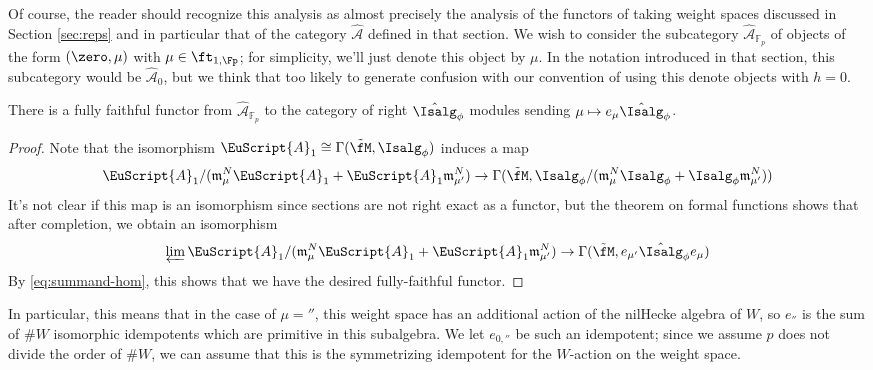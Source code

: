 Of course, the reader should recognize this analysis as almost precisely the analysis of the functors of taking weight spaces discussed in Section \ref{sec:reps} and in particular that of the category $\widehat{\mathscr{A}}$ defined in that section.  We wish to consider the subcategory $\widehat{\mathscr{A}}_{\mathbb{F}_p}$ of objects of the form $(\zero, \mu)$ with $\mu \in \ft_{1,\Fp}$; for simplicity, we'll just denote this object by $\mu$.  In the notation introduced in that section, this subcategory would be $\widehat{\mathscr{A}}_0$, but we think that too likely to generate confusion with our convention of using this denote objects with $h=0$.
\begin{lemma}\label{lem:A-H}
There is a fully faithful functor from  $\widehat{\mathscr{A}}_{\mathbb{F}_p}$ to the category of right $ \hat{\Isalg}_\phi$ modules sending  $\mu\mapsto e_{\mu}\hat{\Isalg}_\phi $.  
\end{lemma}
\begin{proof}
  Note that the isomorphism $\EuScript{A}_1\cong \Gamma(\tilde{\fM},{\Isalg}_\phi)$ induces a map
  \[ \EuScript{A}_1/(\mathfrak{m}_{\mu}^N
 \EuScript{A}_1+\EuScript{A}_1\mathfrak{m}_{\mu'}^N) \to \Gamma(\tilde{\fM}, {\Isalg}_\phi/(\mathfrak{m}_{\mu}^N
 {\Isalg}_\phi+{\Isalg}_\phi\mathfrak{m}_{\mu'}^N)  )\]
It's not clear if this map is an isomorphism since sections are not right exact as a functor, but the theorem on formal functions \cite[\href{https://stacks.math.columbia.edu/tag/02OC}{Theorem 02OC}]{stacks-project} shows that after completion, we obtain an isomorphism
  \[ \varprojlim
 \EuScript{A}_1/(\mathfrak{m}_{\mu}^N
 \EuScript{A}_1+\EuScript{A}_1\mathfrak{m}_{\mu'}^N)\to \Gamma(\tilde{\fM}, e_{\mu'}\hat{\Isalg}_\phi e_{\mu})\]
  By \eqref{eq:summand-hom}, this shows that we have the desired fully-faithful functor.
\end{proof}

In particular, this means that in the case of $\mu=\second$, this weight space has an additional action of the nilHecke algebra of $W$, so $e_{\second}$ is the sum of $\#W$ isomorphic idempotents which are primitive in this subalgebra. We let $e_{0,\second}$ be such an idempotent; since we assume  $p$ does not divide the order of $\# W$, we can assume that this is the symmetrizing idempotent for the $W$-action on the weight space.   


